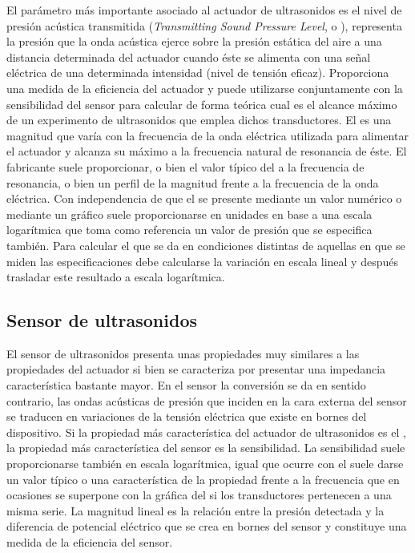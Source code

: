 \sshortpage{}

El parámetro más importante asociado al actuador de ultrasonidos es el
nivel de presión acústica transmitida (\emph{Transmitting Sound Pressure
Level}, o ), representa la presión que la onda acústica ejerce
sobre la presión estática del aire a una distancia determinada del actuador
cuando éste se alimenta con una señal eléctrica de una determinada
intensidad (nivel de tensión eficaz). Proporciona una medida de la
eficiencia del actuador y puede utilizarse conjuntamente con la
sensibilidad del sensor para calcular de forma teórica cual es el alcance
máximo de un experimento de ultrasonidos que emplea dichos transductores.
El  es una magnitud que varía con la frecuencia de la onda
eléctrica utilizada para alimentar el actuador y alcanza su máximo a la
frecuencia natural de resonancia de éste. El fabricante suele proporcionar,
o bien el valor típico del  a la frecuencia de resonancia, o bien
un perfil de la magnitud frente a la frecuencia de la onda eléctrica. Con
independencia de que el  se presente mediante un valor numérico o
mediante un gráfico suele proporcionarse en unidades en base a una escala
logarítmica que toma como referencia un valor de presión que se especifica
también. Para calcular el  que se da en condiciones distintas de
aquellas en que se miden las especificaciones debe calcularse la variación
en escala lineal y después trasladar este resultado a escala logarítmica.


\subsection{Sensor de ultrasonidos}

El sensor de ultrasonidos presenta unas propiedades muy similares a las
propiedades del actuador si bien se caracteriza por presentar una
impedancia característica bastante mayor. En el sensor la conversión se da
en sentido contrario, las ondas acústicas de presión que inciden en la cara
externa del sensor se traducen en variaciones de la tensión eléctrica que
existe en bornes del dispositivo. Si la propiedad más característica del
actuador de ultrasonidos es el , la propiedad más característica
del sensor es la sensibilidad. La sensibilidad suele proporcionarse también
en escala logarítmica, igual que ocurre con el  suele darse un
valor típico o una característica de la propiedad frente a la frecuencia
que en ocasiones se superpone con la gráfica del  si los
transductores pertenecen a una misma serie. La magnitud lineal es la
relación entre la presión detectada y la diferencia de potencial eléctrico
que se crea en bornes del sensor y constituye una medida de la eficiencia
del sensor.


